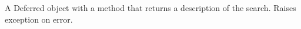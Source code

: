 A Deferred object with a  method that returns a description of
the search.  Raises exception on error.
